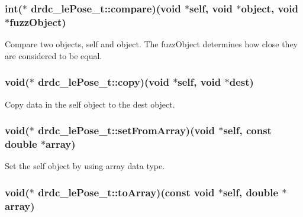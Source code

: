 \hypertarget{structdrdc__lePose__t_37cacd1dd11b7f44570510f8ec3bf6d9}{
\subsubsection[compare]{\setlength{\rightskip}{0pt plus 5cm}int($\ast$ {\bf drdc\_\-lePose\_\-t::compare})(void $\ast$self, void $\ast$object, void $\ast$fuzzObject)}}
\label{structdrdc__lePose__t_37cacd1dd11b7f44570510f8ec3bf6d9}


Compare two objects, self and object. The fuzzObject determines how close they are considered to be equal. 

\hypertarget{structdrdc__lePose__t_6d5330ca33cba9376ec6c5ea1aa2c38c}{
\subsubsection[copy]{\setlength{\rightskip}{0pt plus 5cm}void($\ast$ {\bf drdc\_\-lePose\_\-t::copy})(void $\ast$self, void $\ast$dest)}}
\label{structdrdc__lePose__t_6d5330ca33cba9376ec6c5ea1aa2c38c}


Copy data in the self object to the dest object. 

\hypertarget{structdrdc__lePose__t_563282655a158b6e2ea44477d02ef1e3}{
\subsubsection[setFromArray]{\setlength{\rightskip}{0pt plus 5cm}void($\ast$ {\bf drdc\_\-lePose\_\-t::setFromArray})(void $\ast$self, const double $\ast$array)}}
\label{structdrdc__lePose__t_563282655a158b6e2ea44477d02ef1e3}


Set the self object by using array data type. 

\hypertarget{structdrdc__lePose__t_5b46f3177e98426490325c7ec638b99e}{
\subsubsection[toArray]{\setlength{\rightskip}{0pt plus 5cm}void($\ast$ {\bf drdc\_\-lePose\_\-t::toArray})(const void $\ast$self, double $\ast$array)}}
\label{structdrdc__lePose__t_5b46f3177e98426490325c7ec638b99e}


